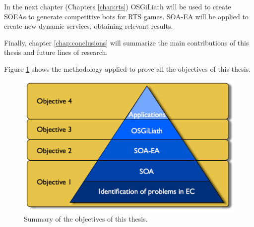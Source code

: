 In the next chapter (Chapters \ref{chap:rts}) OSGiLiath will be used to create SOEAs to generate competitive bots for RTS games. SOA-EA will be applied to create new dynamic services, obtaining relevant results. %

Finally, chapter \ref{chap:conclusions} will summarize the main contributions of this thesis and future lines of research.

Figure \ref{fig:intro:piramid} shows the methodology applied to prove all the objectives of this thesis.

\begin{figure}
\centering
 \includegraphics[scale =0.3] {gfx/intro/tesispiramide.pdf}
\caption{Summary of the objectives of this thesis.}
\label{fig:intro:piramid}
\end{figure}

